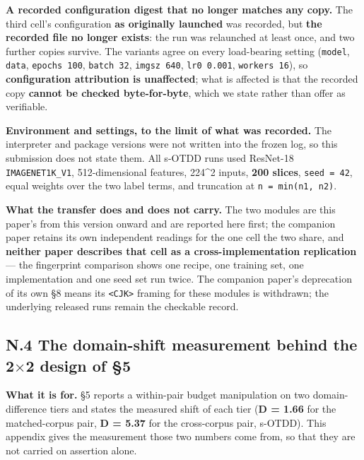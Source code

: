 \documentclass[pdflatex,sn-mathphys-ay]{sn-jnl}
\begin{document}
\textbf{A recorded configuration digest that no longer matches any copy.} The third cell's configuration \textbf{as originally launched} was recorded, but \textbf{the recorded file no longer exists}: the run was relaunched at least once, and two further copies survive. The variants agree on every load-bearing setting (\texttt{model}, \texttt{data}, \texttt{epochs 100}, \texttt{batch 32}, \texttt{imgsz 640}, \texttt{lr0 0.001}, \texttt{workers 16}), so \textbf{configuration attribution is unaffected}; what is affected is that the recorded copy \textbf{cannot be checked byte-for-byte}, which we state rather than offer as verifiable.

\textbf{Environment and settings, to the limit of what was recorded.} The interpreter and package versions were not written into the frozen log, so this submission does not state them. All s-OTDD runs used ResNet-18 \texttt{IMAGENET1K\_V1}, 512-dimensional features, 224\textasciicircum{}2 inputs, \textbf{200 slices}, \texttt{seed = 42}, equal weights over the two label terms, and truncation at \texttt{n = min(n1, n2)}.

\textbf{What the transfer does and does not carry.} The two modules are this paper's from this version onward and are reported here first; the companion paper retains its own independent readings for the one cell the two share, and \textbf{neither paper describes that cell as a cross-implementation replication} --- the fingerprint comparison shows one recipe, one training set, one implementation and one seed set run twice. The companion paper's deprecation of its own \S{}8 means its \texttt{<CJK>} framing for these modules is withdrawn; the underlying released runs remain the checkable record.

\subsection*{N.4 The domain-shift measurement behind the 2\ensuremath{\times}2 design of \S{}5}

\textbf{What it is for.} \S{}5 reports a within-pair budget manipulation on two domain-difference tiers and states the measured shift of each tier (\textbf{D = 1.66} for the matched-corpus pair, \textbf{D = 5.37} for the cross-corpus pair, s-OTDD). This appendix gives the measurement those two numbers come from, so that they are not carried on assertion alone.
\end{document}
